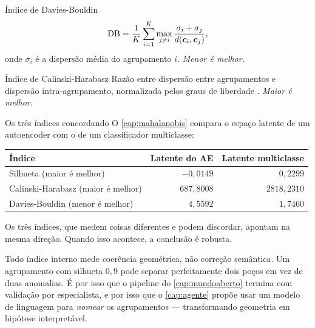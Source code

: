 \begin{definicao}{Índice de Davies-Bouldin}
\begin{equation}
  \text{DB} = \frac{1}{K}\sum_{i=1}^{K} \max_{j \ne i}
  \frac{\sigma_i + \sigma_j}{d(\bm{c}_i, \bm{c}_j)},
  \label{eq:db}
\end{equation}
onde $\sigma_i$ é a dispersão média do agrupamento $i$. \emph{Menor é melhor.}
\end{definicao}

\begin{definicao}{Índice de Calinski-Harabasz}
Razão entre dispersão entre agrupamentos e dispersão intra-agrupamento, normalizada
pelos graus de liberdade \citep{Calinski1974}. \emph{Maior é melhor.}
\end{definicao}

\begin{exemplo}{Os três índices concordando}
O \cref{cap:mahalanobis} compara o espaço latente de um autoencoder com o de um
classificador multiclasse:

\begin{center}
\small
\begin{tabular}{lrr}
\toprule
\textbf{Índice} & \textbf{Latente do AE} & \textbf{Latente multiclasse} \\
\midrule
Silhueta (maior é melhor)          & $-0{,}0149$ & $0{,}2299$ \\
Calinski-Harabasz (maior é melhor) & $687{,}8008$ & $2818{,}2310$ \\
Davies-Bouldin (menor é melhor)    & $4{,}5592$  & $1{,}7460$ \\
\bottomrule
\end{tabular}
\end{center}

Os três índices, que medem coisas diferentes e podem discordar, apontam na mesma
direção. Quando isso acontece, a conclusão é robusta.
\end{exemplo}

\begin{destaque}
Todo índice interno mede coerência geométrica, não correção semântica. Um agrupamento
com silhueta $0{,}9$ pode separar perfeitamente dois poços em vez de duas anomalias.
É por isso que o pipeline do \cref{cap:mundoaberto} termina com validação por
especialista, e por isso que o \cref{cap:agente} propõe usar um modelo de linguagem
para \emph{nomear} os agrupamentos --- transformando geometria em hipótese
interpretável.
\end{destaque}

